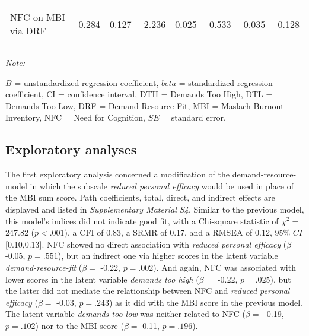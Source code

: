 \documentclass[
  english,
  man,floatsintext]{apa6}
\begin{document}
\begin{table}
{\begin{threeparttable}
\begin{tabular}[t]{lrrrrrrr}
\hspace{1em}\cellcolor{gray!6}{NFC on MBI via DTL} & \cellcolor{gray!6}{-0.042} & \cellcolor{gray!6}{0.033} & \cellcolor{gray!6}{-1.270} & \cellcolor{gray!6}{0.204} & \cellcolor{gray!6}{-0.107} & \cellcolor{gray!6}{0.023} & \cellcolor{gray!6}{-0.019}\\
\hspace{1em}NFC on MBI via DRF & -0.284 & 0.127 & -2.236 & 0.025 & -0.533 & -0.035 & -0.128\\
\addlinespace[0.3em]
\multicolumn{8}{l}{\textbf{Total Effect}}\\
\hspace{1em}\cellcolor{gray!6}{Total Effect} & \cellcolor{gray!6}{-0.775} & \cellcolor{gray!6}{0.258} & \cellcolor{gray!6}{-3.003} & \cellcolor{gray!6}{0.003} & \cellcolor{gray!6}{-1.280} & \cellcolor{gray!6}{-0.269} & \cellcolor{gray!6}{-0.349}\\
\bottomrule
\end{tabular}
\begin{tablenotes}
\item \textit{Note: } 
\item $B$ = unstandardized regression coefficient, $beta$ = standardized regression coefficient, CI = confidence interval, DTH = Demands Too High, DTL = Demands Too Low, DRF = Demand Resource Fit, MBI = Maslach Burnout Inventory, NFC = Need for Cognition, $SE$ = standard error.
\end{tablenotes}
\end{threeparttable}}
\end{table}

\hypertarget{exploratory-analyses-1}{%
\subsection{Exploratory analyses}\label{exploratory-analyses-1}}

The first exploratory analysis concerned a modification of the demand-resource-model in which the subscale \emph{reduced personal efficacy} would be used in place of the MBI sum score.
Path coefficients, total, direct, and indirect effects are displayed and listed in \emph{Supplementary Material S4}.
Similar to the previous model, this model's indices did not indicate good fit, with a Chi-square statistic of \(\chi^2=\) 247.82 (\(p < .001\)), a CFI of 0.83, a SRMR of 0.17, and a RMSEA of 0.12, 95\% \(CI\) {[}0.10,0.13{]}.
NFC showed no direct association with \emph{reduced personal efficacy} (\(\beta=\) -0.05, \(p=.551\)), but an indirect one via higher scores in the latent variable \emph{demand-resource-fit} (\(\beta=\) -0.22, \(p=.002\)).
And again, NFC was associated with lower scores in the latent variable \emph{demands too high} (\(\beta=\) -0.22, \(p=.025\)), but the latter did not mediate the relationship between NFC and \emph{reduced personal efficacy} (\(\beta=\) -0.03, \(p=.243\)) as it did with the MBI score in the previous model.
The latent variable \emph{demands too low} was neither related to NFC (\(\beta=\) -0.19, \(p=.102\)) nor to the MBI score (\(\beta=\) 0.11, \(p=.196\)).
\end{document}
